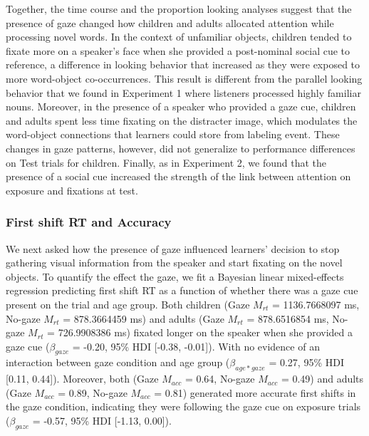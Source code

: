 \documentclass[10pt, letterpaper]{article}
\begin{document}
Together, the time course and the proportion looking analyses suggest
that the presence of gaze changed how children and adults allocated
attention while processing novel words. In the context of unfamiliar
objects, children tended to fixate more on a speaker's face when she
provided a post-nominal social cue to reference, a difference in looking
behavior that increased as they were exposed to more word-object
co-occurrences. This result is different from the parallel looking
behavior that we found in Experiment 1 where listeners processed highly
familiar nouns. Moreover, in the presence of a speaker who provided a
gaze cue, children and adults spent less time fixating on the distracter
image, which modulates the word-object connections that learners could
store from labeling event. These changes in gaze patterns, however, did
not generalize to performance differences on Test trials for children.
Finally, as in Experiment 2, we found that the presence of a social cue
increased the strength of the link between attention on exposure and
fixations at test.

\hypertarget{first-shift-rt-and-accuracy}{%
\subsubsection{First shift RT and
Accuracy}\label{first-shift-rt-and-accuracy}}

We next asked how the presence of gaze influenced learners' decision to
stop gathering visual information from the speaker and start fixating on
the novel objects. To quantify the effect the gaze, we fit a Bayesian
linear mixed-effects regression predicting first shift RT as a function
of whether there was a gaze cue present on the trial and age group. Both
children (Gaze \(M_{rt}\) = 1136.7668097 ms, No-gaze \(M_{rt}\) =
878.3664459 ms) and adults (Gaze \(M_{rt}\) = 878.6516854 ms, No-gaze
\(M_{rt}\) = 726.9908386 ms) fixated longer on the speaker when she
provided a gaze cue (\(\beta_{gaze}\) = -0.20, 95\% HDI {[}-0.38,
-0.01{]}). With no evidence of an interaction between gaze condition and
age group (\(\beta_{age*gaze}\) = 0.27, 95\% HDI {[}0.11, 0.44{]}).
Moreover, both (Gaze \(M_{acc}\) = 0.64, No-gaze \(M_{acc}\) = 0.49) and
adults (Gaze \(M_{acc}\) = 0.89, No-gaze \(M_{acc}\) = 0.81) generated
more accurate first shifts in the gaze condition, indicating they were
following the gaze cue on exposure trials (\(\beta_{gaze}\) = -0.57,
95\% HDI {[}-1.13, 0.00{]}).
\end{document}
